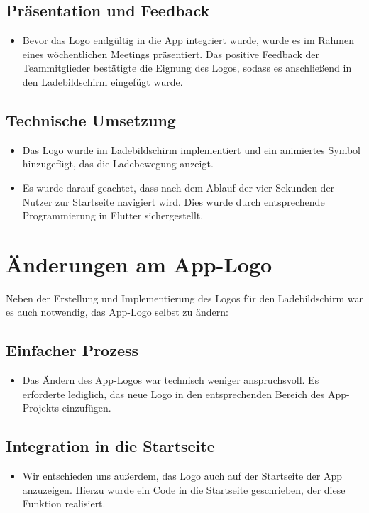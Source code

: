 \subsection{Präsentation und Feedback}

\begin{itemize}
    \item Bevor das Logo endgültig in die App integriert wurde, wurde es im Rahmen eines wöchentlichen Meetings präsentiert. Das positive Feedback der Teammitglieder bestätigte die Eignung des Logos, sodass es anschließend in den Ladebildschirm eingefügt wurde.
\end{itemize}

\subsection{Technische Umsetzung}

\begin{itemize}
    \item Das Logo wurde im Ladebildschirm implementiert und ein animiertes Symbol hinzugefügt, das die Ladebewegung anzeigt.
    \item Es wurde darauf geachtet, dass nach dem Ablauf der vier Sekunden der Nutzer zur Startseite navigiert wird. Dies wurde durch entsprechende Programmierung in Flutter sichergestellt.
\end{itemize}

\section{Änderungen am App-Logo}

Neben der Erstellung und Implementierung des Logos für den Ladebildschirm war es auch notwendig, das App-Logo selbst zu ändern:

\subsection{Einfacher Prozess}

\begin{itemize}
    \item Das Ändern des App-Logos war technisch weniger anspruchsvoll. Es erforderte lediglich, das neue Logo in den entsprechenden Bereich des App-Projekts einzufügen.
\end{itemize}

\subsection{Integration in die Startseite}

\begin{itemize}
    \item Wir entschieden uns außerdem, das Logo auch auf der Startseite der App anzuzeigen. Hierzu wurde ein Code in die Startseite geschrieben, der diese Funktion realisiert.
\end{itemize}